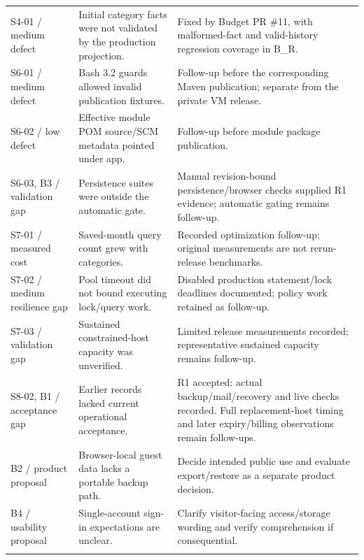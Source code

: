 \documentclass[11pt,a4paper]{article}
\begin{document}
{\begin{longtable}{@{}>{\raggedright\arraybackslash}p{}>{\raggedright\arraybackslash}p{}>{\raggedright\arraybackslash}p{}@{}}
S4-01 /\allowbreak{} medium defect & Initial category facts were not validated by the production projection. & Fixed by Budget PR \#11, with malformed-fact and valid-history regression coverage in B\_R. \\ \addlinespace[3pt]
S6-01 /\allowbreak{} medium defect & Bash 3.2 guards allowed invalid publication fixtures. & Follow-up before the corresponding Maven publication; separate from the private VM release. \\ \addlinespace[3pt]
S6-02 /\allowbreak{} low defect & Effective module POM source/\allowbreak{}SCM metadata pointed under app. & Follow-up before module package publication. \\ \addlinespace[3pt]
S6-03, B3 /\allowbreak{} validation gap & Persistence suites were outside the automatic gate. & Manual revision-bound persistence/\allowbreak{}browser checks supplied R1 evidence; automatic gating remains follow-up. \\ \addlinespace[3pt]
S7-01 /\allowbreak{} measured cost & Saved-month query count grew with categories. & Recorded optimization follow-up; original measurements are not rerun-release benchmarks. \\ \addlinespace[3pt]
S7-02 /\allowbreak{} medium resilience gap & Pool timeout did not bound executing lock/\allowbreak{}query work. & Disabled production statement/\allowbreak{}lock deadlines documented; policy work retained as follow-up. \\ \addlinespace[3pt]
S7-03 /\allowbreak{} validation gap & Sustained constrained-host capacity was unverified. & Limited release measurements recorded; representative sustained capacity remains follow-up. \\ \addlinespace[3pt]
S8-02, B1 /\allowbreak{} acceptance gap & Earlier records lacked current operational acceptance. & R1 accepted: actual backup/\allowbreak{}mail/\allowbreak{}recovery and live checks recorded. Full replacement-host timing and later expiry/\allowbreak{}billing observations remain follow-ups. \\ \addlinespace[3pt]
B2 /\allowbreak{} product proposal & Browser-local guest data lacks a portable backup path. & Decide intended public use and evaluate export/\allowbreak{}restore as a separate product decision. \\ \addlinespace[3pt]
B4 /\allowbreak{} usability proposal & Single-account sign-in expectations are unclear. & Clarify visitor-facing access/\allowbreak{}storage wording and verify comprehension if consequential. \\ \addlinespace[3pt]
\end{longtable}}
\end{document}
